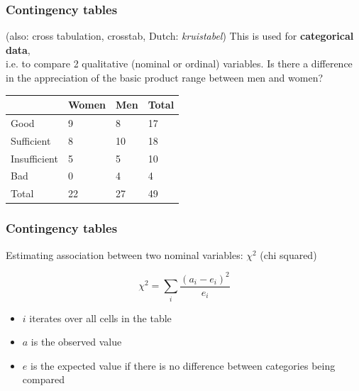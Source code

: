 \documentclass{beamer}
\begin{document}
\begin{frame}
  \frametitle{Contingency tables}
  (also: cross tabulation, crosstab, Dutch: \emph{kruistabel})
  \vfill
  This is used for \textbf{categorical data},\\
  i.e. to compare 2 qualitative (nominal or ordinal) variables.
  \vfill
  Is there a difference in the appreciation of the basic product range between men and women?
  \begin{table}[h]
    \begin{tabular}{l||l|l||l}
                   & Women & Men & Total \\ \hline\hline
      Good         & 9     & 8   & 17    \\
      Sufficient   & 8     & 10  & 18    \\
      Insufficient & 5     & 5   & 10    \\
      Bad          & 0     & 4   & 4     \\ \hline\hline
      Total        & 22    & 27  & 49
    \end{tabular}
  \end{table}
\end{frame}

\begin{frame}
  \frametitle{Contingency tables}
  
  Estimating association between two nominal variables: $\chi^2$ (chi squared)
  
  \[ \chi^2 = \sum_i \frac{(a_i - e_i)^2}{e_i} \]
  
  \begin{itemize}
    \item $i$ iterates over all cells in the table
    \item $a$ is the observed value
    \item $e$ is the expected value if there is no difference between categories being compared
  \end{itemize}
  
\end{frame}
\end{document}
